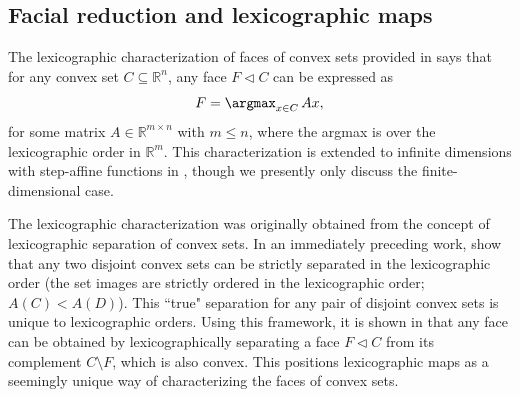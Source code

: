 \documentclass{article}
\theoremstyle{plain}
\theoremstyle{definition}
\theoremstyle{remark}
\begin{document}
\subsection{Facial reduction and lexicographic maps}
\label{loc:body.applications.facial_reduction_and_lexicographic_maps}
The lexicographic characterization of faces of convex sets provided
in \cite[Theorem 2]{martinez-legaz_LEXICOGRAPHICALCHARACTERIZATIONFACES_}
says that for any convex set $C \subseteq \mathbb{R}^n$, any face
$F \triangleleft C$ can be expressed as 
\begin{equation*}
F = \argmax_{x  \in  C} \, Ax,
\end{equation*}
for some matrix $A \in \mathbb{R}^{m \times n}$ with $m \le n$, 
where the argmax is over the lexicographic order in $\mathbb{R}^m$. 
This characterization is extended to infinite dimensions with step-affine
functions in \cite{gorokhovikCharacterizationsFacesConvex2026}, though
we presently only discuss the finite-dimensional case.

The lexicographic characterization was originally obtained from the concept of lexicographic separation of convex sets. In
an immediately preceding work, \textcite{martinez-legazLexicographicalSeparationRn1987} show that any
two disjoint convex sets can be strictly separated in the lexicographic order
(the set images are strictly ordered in the lexicographic order; $A(C) < A(D)$).
This ``true" separation for any pair of disjoint convex sets is unique to lexicographic orders.
Using this framework,
it is shown in \cite{martinez-legaz_LEXICOGRAPHICALCHARACTERIZATIONFACES_}
that any face can be obtained by lexicographically separating 
a face $F \triangleleft C$ from its complement
$C \setminus F$, which is also convex. This positions lexicographic maps as a seemingly unique
way of characterizing the faces of convex sets.
\end{document}
